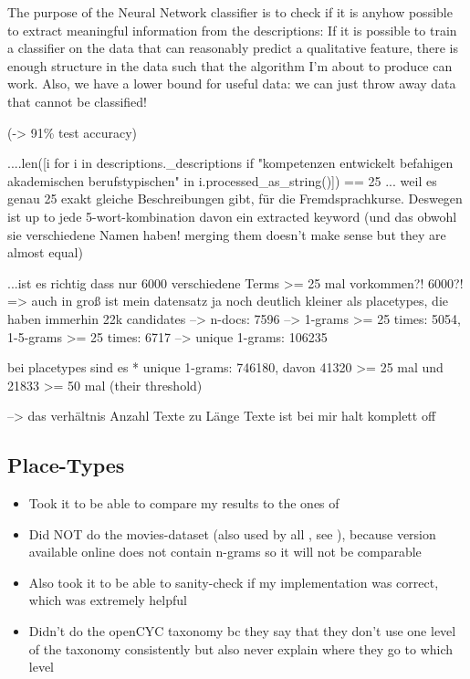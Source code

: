 The purpose of the Neural Network classifier is to check if it is anyhow possible to extract meaningful information from the descriptions: If it is possible to train a classifier on the data that can reasonably predict a qualitative feature, there is enough structure in the data such that the algorithm I'm about to produce can work.
Also, we have a lower bound for useful data: we can just throw away data that cannot be classified!

(-> 91\% test accuracy)


....len([i for i in descriptions._descriptions if "kompetenzen entwickelt befahigen akademischen berufstypischen" in i.processed_as_string()]) == 25  ... weil es genau 25 exakt gleiche Beschreibungen gibt, für die Fremdsprachkurse. Deswegen ist up to jede 5-wort-kombination davon ein extracted keyword
(und das obwohl sie verschiedene Namen haben! merging them doesn't make sense but they are almost equal)


...ist es richtig dass nur 6000 verschiedene Terms >= 25 mal vorkommen?! 6000?!
=> auch in groß ist mein datensatz ja noch deutlich kleiner als placetypes, die haben immerhin 22k candidates
--> n-docs: 7596
--> 1-grams >= 25 times: 5054, 1-5-grams >= 25 times: 6717
--> unique 1-grams: 106235

bei placetypes sind es 
* unique 1-grams: 746180, davon 41320 >= 25 mal und 21833 >= 50 mal (their threshold)

--> das verhältnis Anzahl Texte zu Länge Texte ist bei mir halt komplett off 



\subsection{Place-Types}

\begin{itemize}
	\item Took it to be able to compare my results to the ones of \mainalgos
	\item Did NOT do the movies-dataset (also used by all \mainalgos, see ), because version available online does not contain n-grams so it will not be comparable
	\item Also took it to be able to sanity-check if my implementation was correct, which was extremely helpful
	\item Didn't do the openCYC taxonomy bc they say that they don't use one level of the taxonomy consistently but also never explain where they go to which level
\end{itemize}

